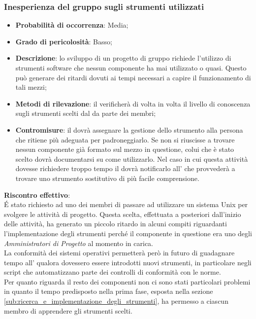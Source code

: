 		\subsubsection{Inesperienza del gruppo sugli strumenti utilizzati} %
		\label{ssub:inesperienza_del_gruppo_sugli_strumenti_utilizzati}
			\begin{itemize}
				\item \textbf{Probabilità di occorrenza}: Media;
				\item \textbf{Grado di pericolosità}: Basso;
				\item \textbf{Descrizione}: lo sviluppo di un progetto di gruppo richiede l'utilizzo di strumenti software che nessun componente ha mai utilizzato o quasi. Questo può generare dei ritardi dovuti ai tempi necessari a capire il funzionamento di tali mezzi;
				\item \textbf{Metodi di rilevazione}: il \roleProjectManager{} verificherà di volta in volta il livello di conoscenza sugli strumenti  scelti dal \roleAdministrator{} da parte dei membri;
				\item \textbf{Contromisure}: il \roleProjectManager{} dovrà assegnare la gestione dello strumento alla persona che ritiene più adeguata per padroneggiarlo. Se non si riuscisse a trovare nessun componente già formato sul mezzo in questione, colui che è stato scelto dovrà documentarsi su come utilizzarlo. Nel caso in cui questa attività dovesse richiedere troppo tempo il \roleProjectManager{} dovrà notificarlo all'\roleAdministrator{} che provvederà a trovare uno strumento sostitutivo di più facile comprensione.
			\end{itemize}
		\noindent
		\textbf{Riscontro effettivo}: \\
		\'E stato richiesto ad uno dei membri di passare ad utilizzare un sistema Unix per svolgere le attività di progetto. Questa scelta, effettuata a posteriori dall'inizio delle attività, ha generato un piccolo ritardo in alcuni compiti riguardanti l'implementazione degli strumenti perché il componente in questione era uno degli \emph{Amministratori di Progetto} al momento in carica. \\
		La conformità dei sistemi operativi permetterà però in futuro di guadagnare tempo all'\roleAdministrator{} qualora dovessero essere introdotti nuovi strumenti, in particolare negli script che automatizzano parte dei controlli di conformità con le norme. \\
		Per quanto riguarda il resto dei componenti non ci sono stati particolari problemi in quanto il tempo predisposto nella prima fase, esposta nella sezione \ref{sub:ricerca_e_implementazione_degli_strumenti}, ha permesso a ciascun membro di apprendere gli strumenti scelti.
		
